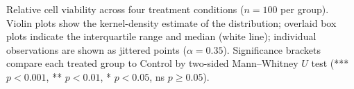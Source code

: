 \caption{Relative cell viability across four treatment conditions ($n=100$ per group).
Violin plots show the kernel-density estimate of the distribution; overlaid box plots indicate the
interquartile range and median (white line); individual observations are shown as jittered points
($\alpha=0.35$).
Significance brackets compare each treated group to Control by two-sided Mann--Whitney $U$ test
(*** $p<0.001$, ** $p<0.01$, * $p<0.05$, ns $p\geq0.05$).}

